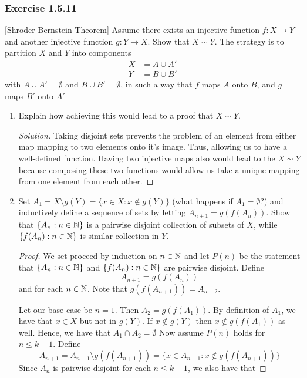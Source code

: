 \begin{enumerate}
 \subsubsection{Exercise 1.5.11}[Shroder-Bernstein Theorem]
 Assume there exists an injective function \( f: X \to Y \) and another injective function \( g: Y \to X \). Show that \( X \sim Y \). The strategy is to partition \( X \) and \( Y \) into components
 \begin{align*}
 X &=  A \cup A' \\
 Y &= B \cup B'
\end{align*}
 with \( A \cup A' = \emptyset \) and \( B \cup B' = \emptyset\), in such a way that \( f \) maps \( A \) onto \( B \), and \( g \) maps \( B' \) onto \( A' \)
\begin{enumerate}
    \item Explain how achieving this would lead to a proof that \( X \sim Y\).
    \begin{proof}[Solution]
    Taking disjoint sets prevents the problem of an element from either map mapping to two elements onto it's image. Thus, allowing us to have a well-defined function. Having two injective maps also would lead to the \( X \sim Y \) because composing these two functions would allow us take a unique mapping from one element from each other.    
    \end{proof}
    \item Set \( A_1 = X \setminus  g(Y) = \{ x \in X: x \notin g(Y) \}\) (what happens if \( A_1 = \emptyset? \)) and inductively define a sequence of sets by letting \( A_{n+1} = g(f(A_n))\). Show that \( \{ A_{n} : n \in \mathbb{N}  \}\) is a pairwise disjoint collection of subsets of \( X \), while \( \{ f(A_n) : n \in \mathbb{N}  \}\) is similar collection in \( Y \).
    \begin{proof}
        We set proceed by induction on \( n \in \mathbb{N} \) and let \( P(n)\) be the statement that 
        \( \{  A_n : n \in \mathbb{N}  \}\) and \( \{ f(A_n) : n \in \mathbb{N}  \}\) are pairwise disjoint.
         Define 
        \[ A_{n+1} = g(f(A_n))\] and 
        for each \( n \in \mathbb{N} \). Note that \( g(f(A_{n+1})) = A_{n+2}\).

        Let our base case be \( n = 1 \). Then \( A_2 = g(f(A_1))\). By definition of \( A_1\), we have that \( x \in X \) but not in \( g(Y)\). If \( x \notin g(Y) \) then \( x \notin g(f(A_1)) \) as well. Hence, we have that \( A_1 \cap A_2 = \emptyset\)        
Now assume \( P(n)\) holds for \( n \leq k-1 \). Define  
        \[ A_{n+1} = A_{n+1} \setminus g(f(A_{n+1})) = \{  x \in A_{n+1} : x \notin g(f(A_{n+1})) \}\]
        Since \(A_n \) is pairwise disjoint for each \( n \leq k-1 \), we also have that


\end{proof}
\end{enumerate}
\end{enumerate}
